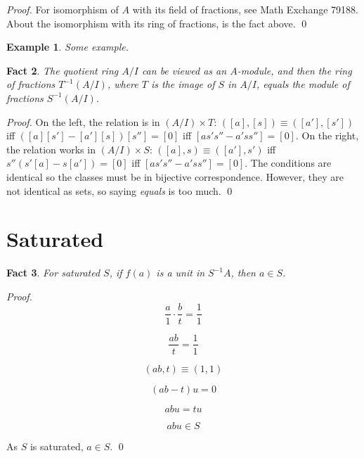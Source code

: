 \documentclass{article}
\newtheorem{theorem}{Fact}[section]
\newtheorem{example}[theorem]{Example}
\begin{document}
\noindent
\textit{Proof.} For isomorphism of $A$ with its field of fractions, see Math Exchange 79188. About the isomorphism with its ring of fractions, is the fact above. \qed

\begin{example}
Some example.
\end{example}

\begin{theorem}
The quotient ring $A/I$ can be viewed as an $A$-module, and then the ring of fractions $T^{-1}(A/I)$, where $T$ is the image of $S$ in $A/I$, equals the module of fractions $S^{-1}(A/I)$.
\end{theorem} 

\noindent
\textit{Proof.} On the left, the relation is in $ (A/I) \times T $: $ ([a], [s]) \equiv ([a'], [s']) $ iff $([a][s'] - [a'][s]) [s''] = [0]$ iff $[as's'' - a'ss''] = [0]$. On the right, the relation works in $ (A/I) \times S $: $ ([a], s) \equiv ([a'], s') $ iff $s'' (s'[a] - s[a']) = [0]$ iff $[as's'' - a'ss''] = [0]$. The conditions are identical so the classes must be in bijective correspondence. However, they are not identical as sets, so saying \textit{equals} is too much.
\qed


\section{Saturated}

\begin{theorem}
For saturated $S$, if $f(a)$ is a unit in $S^{-1}A$, then $a \in S$.
\end{theorem}

\noindent
\textit{Proof.}
\[
  \frac{a}{1} \cdot \frac{b}{t} = \frac{1}{1} 
\]

\[
  \frac{ab}{t} = \frac{1}{1}
\]

\[
   (ab, t) \equiv (1, 1)
\]
 
\[
   (ab - t)u = 0
\]

\[
   abu = tu
\]

\[
   abu \in S
\]

As \( S \) is saturated, \( a \in S \).  \qed
\end{document}
